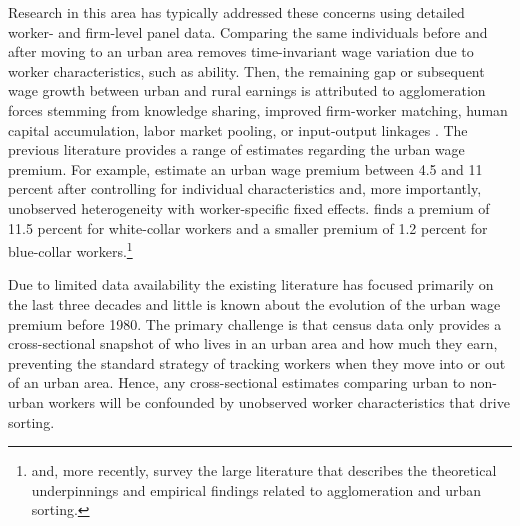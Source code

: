 \documentclass[12pt]{article}
\begin{document}

Research in this area has typically addressed these concerns using detailed worker- and firm-level panel data.
Comparing the same individuals before and after moving to an urban area removes time-invariant wage variation due to worker characteristics, such as ability.
Then, the remaining gap or subsequent wage growth between urban and rural earnings is attributed to agglomeration forces stemming from knowledge sharing, improved firm-worker matching, human capital accumulation, labor market pooling, or input-output linkages \citep*{BaumSnow_Pavan_2012,Combes_Duranton_Gobillon_2008, dauth2022matching, Glaeser_Mare_2001,gould2007cities,Yankow_2006}.
The previous literature provides a range of estimates regarding the urban wage premium.
For example, \citet*{Glaeser_Mare_2001} estimate an urban wage premium between 4.5 and 11 percent after controlling for individual characteristics and, more importantly, unobserved heterogeneity with worker-specific fixed effects. \citet{gould2007cities} finds a premium of 11.5 percent for white-collar workers and a smaller premium of 1.2 percent for blue-collar workers.\footnote{
\citet{rosenthal2004evidence} and, more recently, \citet{diamond2021spatial} survey the large literature that describes the theoretical underpinnings and empirical findings related to agglomeration and urban sorting.}

Due to limited data availability the existing literature has focused primarily on the last three decades and little is known about the evolution of the urban wage premium before 1980.
The primary challenge is that census data only provides a cross-sectional snapshot of who lives in an urban area and how much they earn, preventing the standard strategy of tracking workers when they move into or out of an urban area. 
Hence, any cross-sectional estimates comparing urban to non-urban workers will be confounded by unobserved worker characteristics that drive sorting.
\end{document}
